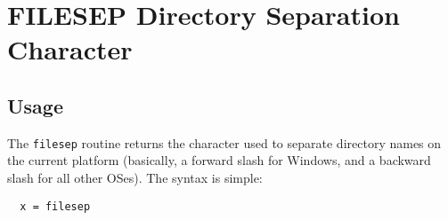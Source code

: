 \section{FILESEP Directory Separation Character}

\subsection{Usage}

The \verb|filesep| routine returns the character used to separate directory
names on the current platform (basically, a forward slash for Windows,
and a backward slash for all other OSes).  The syntax is simple:
\begin{verbatim}
  x = filesep
\end{verbatim}
